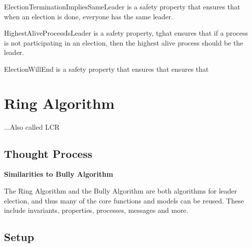 \documentclass{report}
\begin{document}
ElectionTerminationImpliesSameLeader is a safety property that ensures that when an election is done, everyone has the same leader.

HighestAliveProcessIsLeader is a safety property, tghat ensures that if a process is not participating in an election, then the highest alive process should be the leader.

ElectionWillEnd is a safety property that ensures that ensures that


\chapter{Ring Algorithm}

...Also called LCR

\section{Thought Process}

\lipsum[1]

\textbf{Similarities to Bully Algorithm}

The Ring Algorithm and the Bully Algorithm are both algorithms for leader election, and thus many of the core functions and models can be reused. These include invariants, properties, processes, messages and more.

\section{Setup}
\noindent{}
\end{document}
